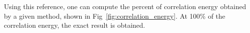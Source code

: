 Using this reference, one can compute the percent of correlation energy obtained by a given method, shown in Fig~\ref{fig:correlation_energy}. 
At 100\% of the correlation energy, the exact result is obtained. 

%
%
%
